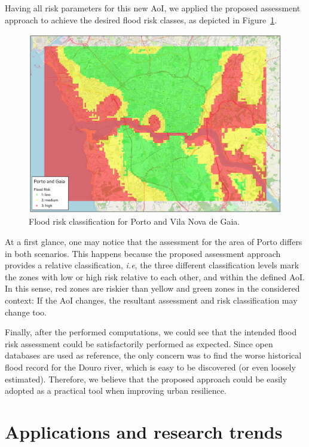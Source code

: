 \begin{refsection}
Having all risk parameters for this new AoI, we applied the proposed assessment approach to achieve the desired flood risk classes, as depicted in Figure~\ref{fig:porto_gaia}. 

\begin{figure}[ht]
  \centering
  \includegraphics[width=0.9\linewidth]{Chapters/6-Flood/figs/porto_gaia.pdf}
  \caption{Flood risk classification for Porto and Vila Nova de Gaia.}\label{fig:porto_gaia}
\end{figure}

At a first glance, one may notice that the assessment for the area of Porto differs in both scenarios. This happens because the proposed assessment approach provides a relative classification, \textit{i.e}, the three different classification levels mark the zones with low or high risk relative to each other, and within the defined AoI. In this sense, red zones are riskier than yellow and green zones in the considered context: If the AoI changes, the resultant assessment and risk classification may change too.

Finally, after the performed computations, we could see that the intended flood risk assessment could be satisfactorily performed as expected. Since open databases are used as reference, the only concern was to find the worse historical flood record for the Douro river, which is easy to be discovered (or even loosely estimated). Therefore, we believe that the proposed approach could be easily adopted as a practical tool when improving urban resilience.

\section{Applications and research trends}\label{sec:applications}


\end{refsection}
